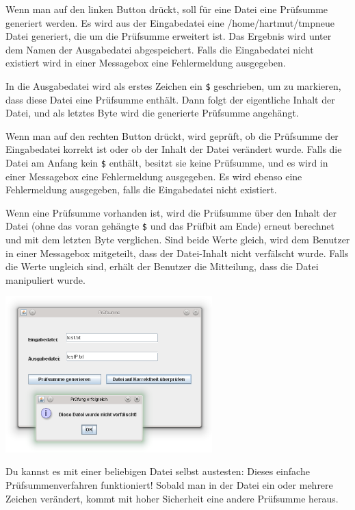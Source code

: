 \begin{compactenum}[a)]
\item Wenn man auf den linken Button drückt, soll für eine Datei eine Prüfsumme
generiert werden. Es wird aus der Eingabedatei eine /home/hartmut/tmpneue Datei
generiert, die um die Prüfsumme erweitert ist. Das Ergebnis wird unter dem Namen der
Ausgabedatei abgespeichert. Falls die Eingabedatei nicht existiert wird in
einer Messagebox eine Fehlermeldung ausgegeben.

In die Ausgabedatei wird als erstes Zeichen ein \lstinline|$| geschrieben, um
zu markieren, dass diese Datei eine Prüfsumme enthält. Dann folgt der
eigentliche Inhalt der Datei, und als letztes Byte wird die generierte
Prüfsumme angehängt.

\item Wenn man auf den rechten Button drückt, wird geprüft, ob die Prüfsumme der
Eingabedatei korrekt ist oder ob der Inhalt der Datei verändert wurde. Falls
die Datei am Anfang kein \lstinline|$| enthält, besitzt sie keine Prüfsumme,
und es wird in einer Messagebox eine Fehlermeldung ausgegeben. Es wird ebenso
eine Fehlermeldung ausgegeben, falls die Eingabedatei nicht existiert.

Wenn eine Prüfsumme vorhanden ist, wird die Prüfsumme über den Inhalt der Datei
(ohne das voran gehängte \lstinline|$| und das Prüfbit am Ende) erneut
berechnet und mit dem letzten Byte verglichen. Sind beide Werte gleich, wird
dem Benutzer in einer Messagebox mitgeteilt, dass der Datei-Inhalt nicht
verfälscht wurde. Falls die Werte ungleich sind, erhält der Benutzer die
Mitteilung, dass die Datei manipuliert wurde.

\begin{center}
\includegraphics[width=0.6\textwidth]{./inf/SEKII/27_Java_Dateizugriffe/Pruefsumme.png}
\end{center}

Du kannst es mit einer beliebigen Datei selbst austesten: Dieses einfache
Prüfsummenverfahren funktioniert! Sobald man in der Datei ein oder mehrere
Zeichen verändert, kommt mit hoher Sicherheit eine andere Prüfsumme heraus.
\end{compactenum}


